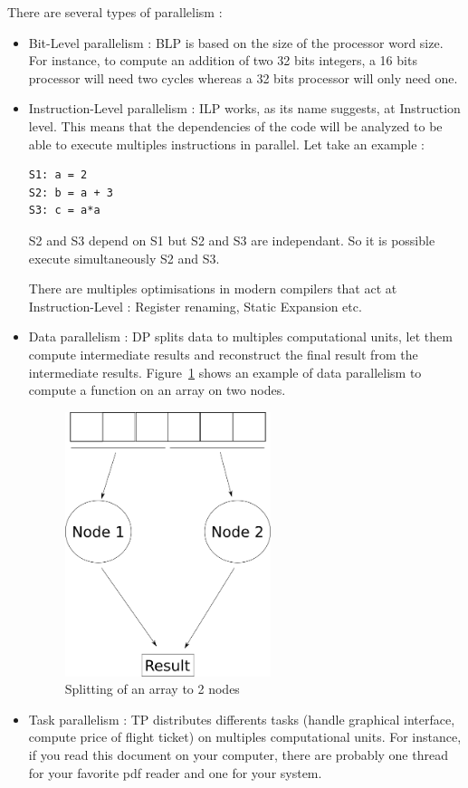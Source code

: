 There are several types of parallelism :
\begin{itemize}
\item Bit-Level parallelism : BLP is based on the size of the processor word size. For instance, to compute an addition of two 32 bits integers, a 16 bits processor will need two cycles whereas a 32 bits processor will only need one.
\item Instruction-Level parallelism : ILP works, as its name suggests, at Instruction level. This means that the dependencies of the code will be analyzed to be able to execute multiples instructions in parallel. Let take an example :
\begin{lstlisting}[frame=single]
S1: a = 2
S2: b = a + 3
S3: c = a*a
\end{lstlisting}
S2 and S3 depend on S1 but S2 and S3 are independant. So it is possible execute simultaneously S2 and S3.

There are multiples optimisations in modern compilers that act at Instruction-Level : Register renaming, Static Expansion etc.
\item Data parallelism : DP splits data to multiples computational units, let them compute intermediate results and reconstruct the final result from the intermediate results. Figure~\ref{fig:Data_Parallelism} shows an example of data parallelism to compute a function on an array on two nodes.
\begin{figure}
\centering
\includegraphics[width=6cm]{gfx/Parallelism/Data_Parallelism.png}
\caption{Splitting of an array to 2 nodes}
\label{fig:Data_Parallelism}
\end{figure}
\item Task parallelism : TP distributes differents tasks (handle graphical interface, compute price of flight ticket) on multiples computational units. For instance, if you read this document on your computer, there are probably one thread for your favorite pdf reader and one for your system. 
\end{itemize}

